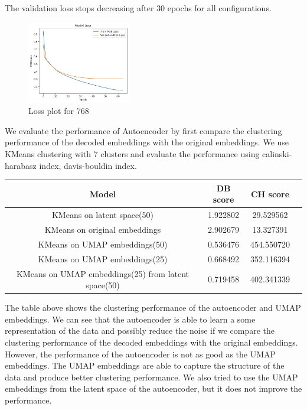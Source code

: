 \documentclass{article}
\begin{document}
The validation loss stops decreasing after 30 epochs for all configurations.
\begin{figure}[h!]
\centering
\includegraphics[width=0.4\textwidth]{figs/mse1-loss.png}
\caption{Loss plot for 768}
\end{figure}

We evaluate the performance of Autoencoder by first compare the clustering performance of the decoded embeddings with the original embeddings. We use KMeans clustering with 7 clusters and evaluate the performance using calinski-harabasz index, davis-bouldin index. 

\begin{center}
    
\begin{tabular}{|c|c|c|c|}
    \hline
    Model & DB score & CH score \\
    \hline
    KMeans on latent space(50) & 1.922802 & 29.529562 \\
    KMeans on original embeddings & 2.902679 & 13.327391 \\
    KMeans on UMAP embeddings(50) & 0.536476 & 454.550720 \\
    KMeans on UMAP embeddings(25) & 0.668492 & 352.116394 \\
    KMeans on UMAP embeddings(25) from latent space(50) & 0.719458 & 402.341339 \\
    \hline
\end{tabular}
\end{center}

The table above shows the clustering performance of the autoencoder and UMAP embeddings. We can see that the autoencoder is able to learn a some representation of the data and possibly reduce the noise if we compare the clustering performance of the decoded embeddings with the original embeddings. However, the performance of the autoencoder is not as good as the UMAP embeddings. The UMAP embeddings are able to capture the structure of the data and produce better clustering performance. We also tried to use the UMAP embeddings from the latent space of the autoencoder, but it does not improve the performance.
\end{document}
